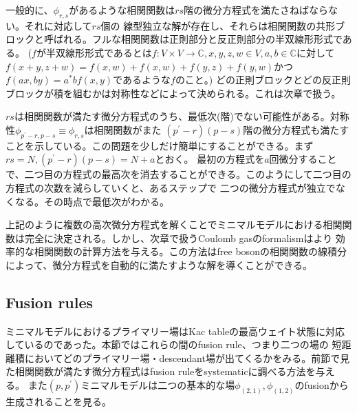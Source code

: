\documentclass[11pt, aps, longbibliography]{article}
\numberwithin{equation}{section}
\begin{document}
        一般的に、$\phi_{r,s}$があるような相関関数は$rs$階の微分方程式を満たさねばならない。それに対応して$rs$個の
        線型独立な解が存在し、それらは相関関数の共形ブロックと呼ばれる。フルな相関関数は正則部分と反正則部分の半双線形形式である。
        ($f$が半双線形形式であるとは$f:V\times V\rightarrow \mathbb{C}, x,y,z,w\in V, a,b\in \mathbb{C}$に対して$f(x+y,z+w)=f(x,w)+f(x,w)+f(y,z)+f(y,w)$かつ$f(ax,by)=a^*bf(x,y)$であるような$f$のこと。)
        どの正則ブロックとどの反正則ブロックが積を組むかは対称性などによって決められる。これは次章で扱う。

        $rs$は相関関数が満たす微分方程式のうち、最低次(階)でない可能性がある。対称性$\phi_{p^\prime-r,p-s}\equiv \phi_{r,s}$は相関関数がまた
        $(p^\prime-r)(p-s)$階の微分方程式も満たすことを示している。この問題を少しだけ簡単にすることができる。まず$rs=N,(p^\prime-r)(p-s)=N+a$とおく。
        最初の方程式を$a$回微分することで、二つ目の方程式の最高次を消去することができる。このようにして二つ目の方程式の次数を減らしていくと、あるステップで
        二つの微分方程式が独立でなくなる。その時点で最低次がわかる。

        上記のように複数の高次微分方程式を解くことでミニマルモデルにおける相関関数は完全に決定される。しかし、次章で扱うCoulomb gasのformalismはより
        効率的な相関関数の計算方法を与える。この方法はfree bosonの相関関数の線積分によって、微分方程式を自動的に満たすような解を導くことができる。

    \subsection{Fusion rules}
    ミニマルモデルにおけるプライマリー場はKac tableの最高ウェイト状態に対応しているのであった。本節ではこれらの間のfusion rule、つまり二つの場の
    短距離積においてどのプライマリー場・descendant場が出てくるかをみる。前節で見た相関関数が満たす微分方程式はfusion ruleをsystematicに調べる方法を与える。
    また$(p,p^\prime)$ミニマルモデルは二つの基本的な場$\phi_{(2,1)},\phi_{(1,2)}$のfusionから生成されることを見る。
\end{document}
